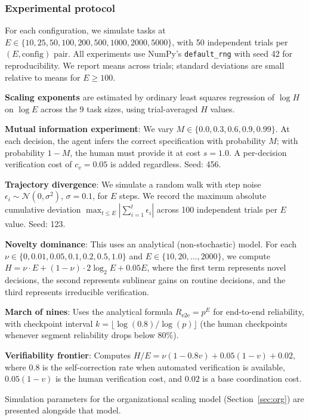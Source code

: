 \documentclass[11pt,a4paper]{article}
\begin{document}
\subsubsection*{Experimental protocol}

For each configuration, we simulate tasks at $E \in \{10, 25, 50, 100, 200, 500, 1000, 2000, 5000\}$, with 50 independent trials per $(E, \text{config})$ pair. All experiments use NumPy's \texttt{default\_rng} with seed 42 for reproducibility. We report means across trials; standard deviations are small relative to means for $E \geq 100$.

\textbf{Scaling exponents} are estimated by ordinary least squares regression of $\log H$ on $\log E$ across the 9 task sizes, using trial-averaged $H$ values.

\textbf{Mutual information experiment}: We vary $M \in \{0.0, 0.3, 0.6, 0.9, 0.99\}$. At each decision, the agent infers the correct specification with probability $M$; with probability $1-M$, the human must provide it at cost $s = 1.0$. A per-decision verification cost of $c_v = 0.05$ is added regardless. Seed: 456.

\textbf{Trajectory divergence}: We simulate a random walk with step noise $\epsilon_i \sim \mathcal{N}(0, \sigma^2)$, $\sigma = 0.1$, for $E$ steps. We record the maximum absolute cumulative deviation $\max_{t \leq E} |\sum_{i=1}^t \epsilon_i|$ across 100 independent trials per $E$ value. Seed: 123.

\textbf{Novelty dominance}: This uses an analytical (non-stochastic) model. For each $\nu \in \{0, 0.01, 0.05, 0.1, 0.2, 0.5, 1.0\}$ and $E \in \{10, 20, \ldots, 2000\}$, we compute $H = \nu \cdot E + (1-\nu) \cdot 2\log_2 E + 0.05 E$, where the first term represents novel decisions, the second represents sublinear gains on routine decisions, and the third represents irreducible verification.

\textbf{March of nines}: Uses the analytical formula $R_{\text{e2e}} = p^E$ for end-to-end reliability, with checkpoint interval $k = \lfloor \log(0.8) / \log(p) \rfloor$ (the human checkpoints whenever segment reliability drops below 80\%).

\textbf{Verifiability frontier}: Computes $H/E = \nu(1 - 0.8v) + 0.05(1-v) + 0.02$, where $0.8$ is the self-correction rate when automated verification is available, $0.05(1-v)$ is the human verification cost, and $0.02$ is a base coordination cost.

Simulation parameters for the organizational scaling model (Section~\ref{sec:org}) are presented alongside that model.
\end{document}
